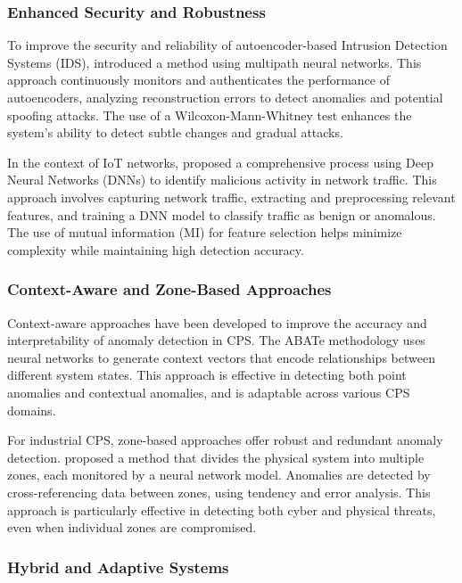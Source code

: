 \subsubsection{Enhanced Security and Robustness}

To improve the security and reliability of autoencoder-based Intrusion Detection Systems (IDS), \cite{88} introduced a method using multipath neural networks. This approach continuously monitors and authenticates the performance of autoencoders, analyzing reconstruction errors to detect anomalies and potential spoofing attacks. The use of a Wilcoxon-Mann-Whitney test enhances the system's ability to detect subtle changes and gradual attacks.

In the context of IoT networks, \cite{80} proposed a comprehensive process using Deep Neural Networks (DNNs) to identify malicious activity in network traffic. This approach involves capturing network traffic, extracting and preprocessing relevant features, and training a DNN model to classify traffic as benign or anomalous. The use of mutual information (MI) for feature selection helps minimize complexity while maintaining high detection accuracy.

\subsubsection{Context-Aware and Zone-Based Approaches}

Context-aware approaches have been developed to improve the accuracy and interpretability of anomaly detection in CPS. The ABATe methodology \cite{49} uses neural networks to generate context vectors that encode relationships between different system states. This approach is effective in detecting both point anomalies and contextual anomalies, and is adaptable across various CPS domains.

For industrial CPS, zone-based approaches offer robust and redundant anomaly detection. \cite{59} proposed a method that divides the physical system into multiple zones, each monitored by a neural network model. Anomalies are detected by cross-referencing data between zones, using tendency and error analysis. This approach is particularly effective in detecting both cyber and physical threats, even when individual zones are compromised.

\subsubsection{Hybrid and Adaptive Systems}

